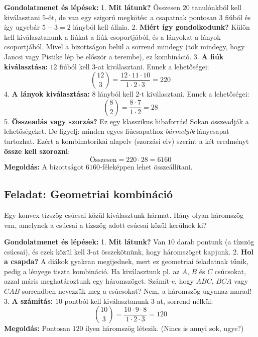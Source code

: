 \documentclass[11pt,a4paper]{article}
\begin{document}
\textbf{Gondolatmenet és lépések:}
1. \textbf{Mit látunk?} Összesen $20$ tanulónkból kell kiválasztani $5$-öt, de van egy szigorú megkötés: a csapatnak pontosan $3$ fiúból és így ugyebár $5 - 3 = 2$ lányból kell állnia.
2. \textbf{Miért így gondolkodunk?} Külön kell kiválasztanunk a fiúkat a fiúk csoportjából, és a lányokat a lányok csoportjából. Mivel a bizottságon belül a sorrend mindegy (tök mindegy, hogy Jancsi vagy Pistike lép be először a terembe), ez kombináció.
3. \textbf{A fiúk kiválasztása:} $12$ fiúból kell $3$-at kiválasztani. Ennek a lehetőségei:
$$\binom{12}{3} = \frac{12 \cdot 11 \cdot 10}{1 \cdot 2 \cdot 3} = 220$$
4. \textbf{A lányok kiválasztása:} $8$ lányból kell $2$-t kiválasztani. Ennek a lehetőségei:
$$\binom{8}{2} = \frac{8 \cdot 7}{1 \cdot 2} = 28$$
5. \textbf{Összeadás vagy szorzás?} Ez egy klasszikus hibaforrás! Sokan összeadják a lehetőségeket. De figyelj: minden egyes fiúcsapathoz \textit{bármelyik} lánycsapat tartozhat. Ezért a kombinatorikai alapelv (szorzási elv) szerint a két eredményt \textbf{össze kell szorozni}:
$$\text{Összesen} = 220 \cdot 28 = 6160$$
\textbf{Megoldás:} A bizottságot $6160$-féleképpen lehet összeállítani.

\subsection*{Feladat: Geometriai kombináció}
\begin{tcolorbox}
Egy konvex tízszög csúcsai közül kiválasztunk hármat. Hány olyan háromszög van, amelynek a csúcsai a tízszög adott csúcsai közül kerülnek ki?
\end{tcolorbox}

\textbf{Gondolatmenet és lépések:}
1. \textbf{Mit látunk?} Van $10$ darab pontunk (a tízszög csúcsai), és ezek közül kell $3$-at összekötnünk, hogy háromszöget kapjunk.
2. \textbf{Hol a csapda?} A diákok gyakran megijednek, mert ez geometriai feladatnak tűnik, pedig a lényege tiszta kombináció. Ha kiválasztunk pl. az $A$, $B$ és $C$ csúcsokat, azzal máris meghatároztunk egy háromszöget. Számít-e, hogy $ABC$, $BCA$ vagy $CAB$ sorrendben nevezzük meg a csúcsokat? Nem, a háromszög ugyanaz marad!
3. \textbf{A számítás:} $10$ pontból kell kiválasztanunk $3$-at, sorrend nélkül:
$$\binom{10}{3} = \frac{10 \cdot 9 \cdot 8}{1 \cdot 2 \cdot 3} = 120$$
\textbf{Megoldás:} Pontosan $120$ ilyen háromszög létezik. (Nincs is annyi sok, ugye?)
\end{document}
